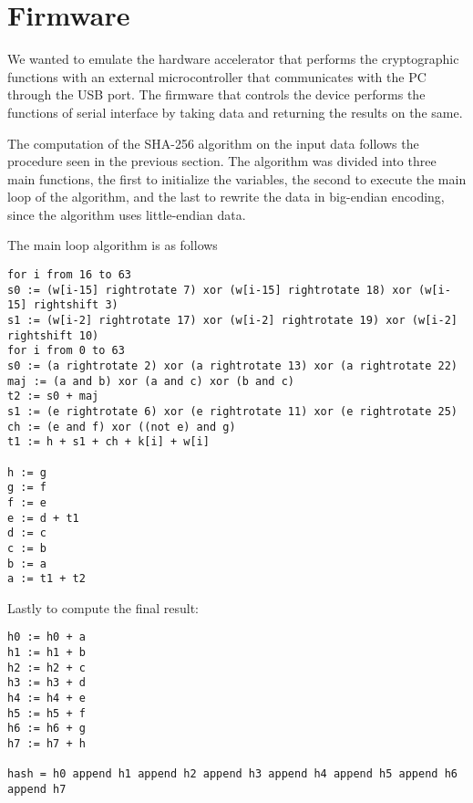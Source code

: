 \section{Firmware}
We wanted to emulate the hardware accelerator that performs the cryptographic functions with an external microcontroller that communicates with the PC through the USB port. The firmware that controls the device performs the functions of serial interface by taking data and returning the results on the same. 

The computation of the SHA-256 algorithm on the input data follows the procedure seen in the previous section. The algorithm was divided into three main functions, the first to initialize the variables, the second to execute the main loop of the algorithm, and the last to rewrite the data in big-endian encoding, since the algorithm uses little-endian data.

The main loop algorithm is as follows
\begin{lstlisting}
for i from 16 to 63
s0 := (w[i-15] rightrotate 7) xor (w[i-15] rightrotate 18) xor (w[i-15] rightshift 3)
s1 := (w[i-2] rightrotate 17) xor (w[i-2] rightrotate 19) xor (w[i-2] rightshift 10)
for i from 0 to 63
s0 := (a rightrotate 2) xor (a rightrotate 13) xor (a rightrotate 22)
maj := (a and b) xor (a and c) xor (b and c)
t2 := s0 + maj
s1 := (e rightrotate 6) xor (e rightrotate 11) xor (e rightrotate 25)
ch := (e and f) xor ((not e) and g)
t1 := h + s1 + ch + k[i] + w[i]

h := g
g := f
f := e
e := d + t1
d := c
c := b
b := a
a := t1 + t2
\end{lstlisting}
Lastly to compute the final result:
\begin{lstlisting}
h0 := h0 + a
h1 := h1 + b
h2 := h2 + c
h3 := h3 + d
h4 := h4 + e
h5 := h5 + f
h6 := h6 + g
h7 := h7 + h

hash = h0 append h1 append h2 append h3 append h4 append h5 append h6 append h7

\end{lstlisting}